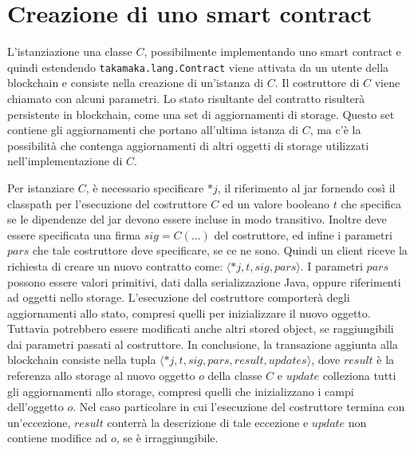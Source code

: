 \section{Creazione di uno smart contract}
L'istanziazione una classe $C$, possibilmente implementando uno smart contract e quindi estendendo \lstinline|takamaka.lang.Contract| viene attivata da un utente della blockchain e consiste nella creazione di un'istanza di $C$. Il costruttore di $C$ viene chiamato con alcuni parametri. Lo stato risultante del contratto risulterà persistente in blockchain, come una set di aggiornamenti di storage. Questo set contiene gli aggiornamenti che portano all'ultima istanza di $C$, ma c'è la possibilità che contenga aggiornamenti di altri oggetti di storage utilizzati nell'implementazione di $C$. 

Per istanziare $C$, è necessario specificare $*j$, il riferimento al jar fornendo così il classpath per l'esecuzione del costruttore $C$ ed un valore booleano $t$ che specifica se le dipendenze del jar devono essere incluse in modo transitivo. Inoltre deve essere specificata una firma $sig = C(\dots)$ del costruttore, ed infine i parametri $pars$ che tale costruttore deve specificare, se ce ne sono. Quindi un client riceve la richiesta di creare un nuovo contratto come: $\langle *j, t, sig, pars \rangle$. I parametri $pars$ possono essere valori primitivi, dati dalla serializzazione Java, oppure riferimenti ad oggetti nello storage. L'esecuzione del costruttore comporterà degli aggiornamenti allo stato, compresi quelli per inizializzare il nuovo oggetto. Tuttavia potrebbero essere modificati anche altri stored object, se raggiungibili dai parametri passati al costruttore. In conclusione, la transazione aggiunta alla blockchain consiste nella tupla $\langle *j, t, sig, pars, result, updates \rangle$, dove $result$ è la referenza allo storage al nuovo oggetto $o$ della classe $C$ e $update$ colleziona tutti gli aggiornamenti allo storage, compresi quelli che inizializzano i campi dell'oggetto $o$. Nel caso particolare in cui l'esecuzione del costruttore termina con un'eccezione, $result$ conterrà la descrizione di tale eccezione e $update$ non contiene modifice ad $o$, se è irraggiungibile.

